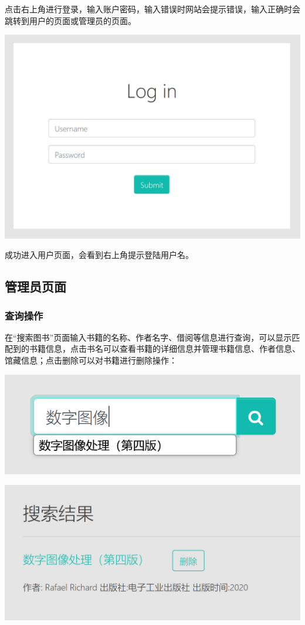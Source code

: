 \documentclass[a4paper,14pt]{article}
\begin{document}
点击右上角进行登录，输入账户密码，输入错误时网站会提示错误，输入正确时会跳转到用户的页面或管理员的页面。

\vspace{10pt}
\begin{center}
    \includegraphics[width=0.3\linewidth]{images/login2.png}\end{center}
\vspace{5pt}


成功进入用户页面，会看到右上角提示登陆用户名。

\subsection{管理员页面}
\subsubsection{查询操作}
在“搜索图书”页面输入书籍的名称、作者名字、借阅等信息进行查询，可以显示匹配到的书籍信息，点击书名可以查看书籍的详细信息并管理书籍信息、作者信息、馆藏信息；点击删除可以对书籍进行删除操作：

\vspace{10pt}
\begin{center}
    \includegraphics[width=0.3\linewidth]{images/chaxun1.png}\end{center}

\begin{center}
    \includegraphics[width=0.3\linewidth]{images/chaxun2.png}\end{center}
\end{document}
